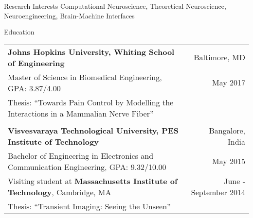 \documentclass{resume}
\begin{document}
\thispagestyle{empty}
  \begin{rSection}{Research Interests}
Computational Neuroscience, Theoretical Neuroscience, Neuroengineering, Brain-Machine Interfaces
  \end{rSection}
  \begin{rSection}{Education}
\begin{tabular*}{\textwidth}{@{\extracolsep{\fill}}lr@{}}
\textbf{Johns Hopkins University, Whiting School of Engineering} & Baltimore, MD \\
{Master of Science in Biomedical Engineering}, GPA: 3.87/4.00 & May 2017 \\
Thesis: {``Towards Pain Control by Modelling the Interactions in a Mammalian Nerve Fiber''}\\ \\
\textbf{Visvesvaraya Technological University, PES Institute of Technology} & Bangalore, India \\
{Bachelor of Engineering in Electronics and Communication Engineering}, GPA: 9.32/10.00 & May 2015 \\
Visiting student at \textbf{Massachusetts Institute of Technology}, Cambridge, MA & June - September 2014 \\
Thesis: {``Transient Imaging: Seeing the Unseen''}\\
\end{tabular*}
  \end{rSection}

\vspace{1em}
\end{document}
